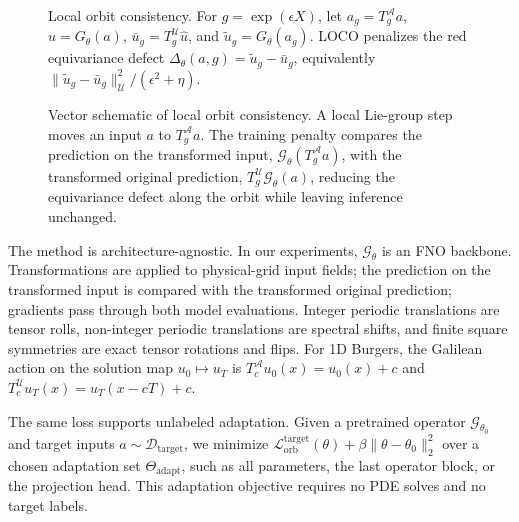 \begin{figure}[t]
{%
}

\caption{
Local orbit consistency.
For \(g=\exp(\epsilon X)\), let
\(a_g=T_g^{\mathcal A}a\),
\(\hat u=G_\theta(a)\),
\(\bar u_g=T_g^{\mathcal U}\hat u\), and
\(\tilde u_g=G_\theta(a_g)\).
LOCO penalizes the red equivariance defect
\(\Delta_\theta(a,g)=\tilde u_g-\bar u_g\), equivalently
\(\|\tilde u_g-\bar u_g\|_{\mathcal U}^2/(\epsilon^2+\eta)\).
}
\label{fig:loco-intuition}
\end{figure}

\begin{figure}[t]
\centering

\caption{Vector schematic of local orbit consistency. A local Lie-group step moves an input \(a\) to \(T_g^{\mathcal A}a\). The training penalty compares the prediction on the transformed input, \(\mathcal G_\theta(T_g^{\mathcal A}a)\), with the transformed original prediction, \(T_g^{\mathcal U}\mathcal G_\theta(a)\), reducing the equivariance defect along the orbit while leaving inference unchanged.}
\label{fig:orbit-consistency-diagram}
\end{figure}

The method is architecture-agnostic. In our experiments, \(\mathcal G_\theta\) is an FNO backbone. Transformations are applied to physical-grid input fields; the prediction on the transformed input is compared with the transformed original prediction; gradients pass through both model evaluations. Integer periodic translations are tensor rolls, non-integer periodic translations are spectral shifts, and finite square symmetries are exact tensor rotations and flips. For 1D Burgers, the Galilean action on the solution map \(u_0\mapsto u_T\) is \(T_c^{\mathcal A}u_0(x)=u_0(x)+c\) and \(T_c^{\mathcal U}u_T(x)=u_T(x-cT)+c\).

The same loss supports unlabeled adaptation. Given a pretrained operator \(\mathcal G_{\theta_0}\) and target inputs \(a\sim\mathcal D_{\mathrm{target}}\), we minimize \(\mathcal L_{\mathrm{orb}}^{\mathrm{target}}(\theta)+\beta\|\theta-\theta_0\|_2^2\) over a chosen adaptation set \(\Theta_{\mathrm{adapt}}\), such as all parameters, the last operator block, or the projection head. This adaptation objective requires no PDE solves and no target labels.
